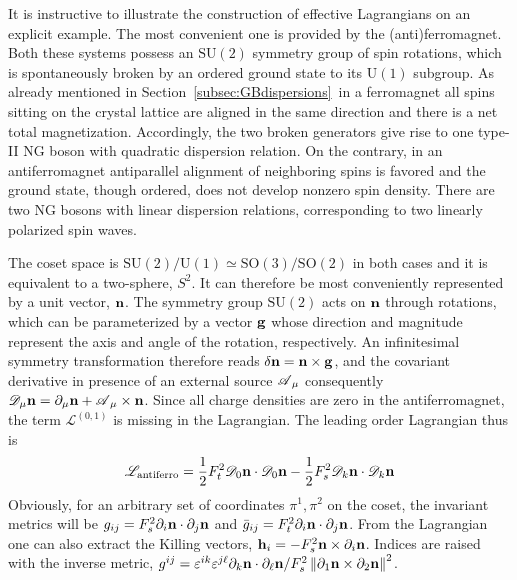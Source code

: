 \documentclass[final,3p,times,12pt,a4paper,sort&compress]{elsarticle}
\newcommand\gr[1]{\mathrm{#1}}              %
\newcommand\Lag{\mathscr{L}}                %
\newcommand\DD{\mathscr{D}}                 %
\newcommand\AAA{\mathscr{A}}                %
\newcommand\vek[1]{{\boldsymbol{\bf #1}}}   %
\newcommand\de{\partial}
\newcommand\ve{\varepsilon}
\newcommand\nor[1]{\left\|#1\right\|}       %
\begin{document}
It is instructive to illustrate the construction of effective Lagrangians on an
explicit example. The most convenient one is provided by the (anti)ferromagnet.
Both these systems possess an $\gr{SU(2)}$ symmetry group of spin rotations,
which is spontaneously broken by an ordered ground state to its $\gr{U(1)}$
subgroup. As already mentioned in Section~\ref{subsec:GBdispersions}\ in a
ferromagnet all spins sitting on the crystal lattice are aligned in the same
direction and there is a net total magnetization. Accordingly, the two broken
generators give rise to one type-II NG boson with quadratic dispersion
relation. On the contrary, in an antiferromagnet antiparallel alignment of
neighboring spins is favored and the ground state, though ordered, does not
develop nonzero spin density. There are two NG bosons with linear dispersion
relations, corresponding to two linearly polarized spin waves.

The coset space is $\gr{SU(2)/U(1)\simeq SO(3)/SO(2)}$ in both cases and it is
equivalent to a two-sphere, $S^2$. It can therefore be most conveniently
represented by a unit vector, $\vek n$. The symmetry group $\gr{SU(2)}$ acts on
$\vek n$ through rotations, which can be parameterized by a vector $\vek g$
whose direction and magnitude represent the axis and angle of the rotation,
respectively. An infinitesimal symmetry transformation therefore reads
$\delta\vek n=\vek n\times\vek g$, and the covariant derivative in presence of
an external source $\vek\AAA_\mu$ consequently $\DD_\mu\vek n=\de_\mu\vek n+
\vek\AAA_\mu\times\vek n$. Since all charge densities are zero in the
antiferromagnet, the term $\Lag^{(0,1)}$ is missing in the Lagrangian. The
leading order Lagrangian thus is
\begin{equation}
\Lag_{\text{antiferro}}=\frac12F_t^2\DD_0\vek n\cdot\DD_0\vek n
-\frac12F_s^2\DD_k\vek n\cdot\DD_k\vek n
\end{equation}
Obviously, for an arbitrary set of coordinates $\pi^1,\pi^2$ on the coset, the
invariant metrics will be $g_{ij}=F_s^2\de_i\vek n\cdot\de_j\vek n$ and
$\bar g_{ij}=F_t^2\de_i\vek n\cdot\de_j\vek n$. From the Lagrangian one can
also extract the Killing vectors, $\vek h_i=-F_s^2\vek n\times\de_i\vek n$.
Indices are raised with the inverse metric,
$g^{ij}=\ve^{ik}\ve^{j\ell}\de_k\vek n\cdot\de_\ell\vek n/F_s^2\nor{\de_1\vek
n\times\de_2\vek n}^2$.
\end{document}
